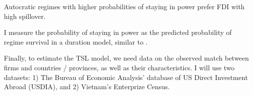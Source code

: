 \begin{hyp}
Autocratic regimes with higher probabilities of staying in power prefer FDI with high spillover.
\end{hyp}

I measure the probability of staying in power as the predicted probability of regime survival in a duration model, similar to  \citet{Wright2008a}.

Finally, to estimate the TSL model, we need data on the observed match between firms and countries / provinces, as well as their characteristics. I will use two datasets: 1) The Bureau of Economic Analysis' database of US Direct Investment Abroad (USDIA), and 2) Vietnam's Enterprize Census.
